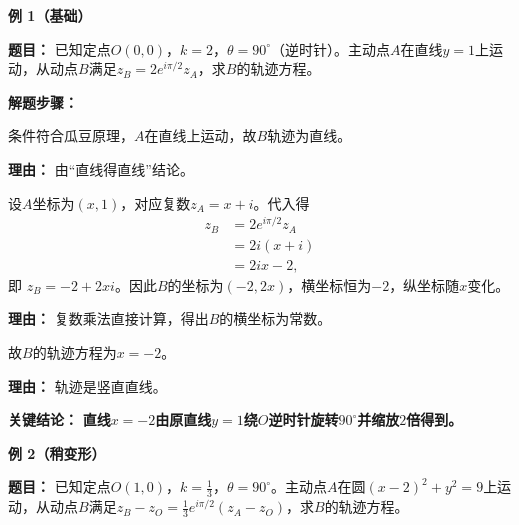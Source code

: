 \begin{examplebox}
	\textbf{\textcolor{CExample}{例 1（基础）}}

	\textbf{\textcolor{CExample}{题目：}}
	已知定点$O(0,0)$，$k=2$，$\theta=90^\circ$（逆时针）。主动点$A$在直线$y=1$上运动，从动点$B$满足$z_B = 2 e^{i\pi/2} z_A$，求$B$的轨迹方程。

	\textbf{\textcolor{CExample}{解题步骤：}}
	\begin{description}[style=nextline, leftmargin=2.8em, labelsep=0.5em, itemsep=0.45em]
		\item[\textbf{第一步（识别模型）：}] 条件符合瓜豆原理，$A$在直线上运动，故$B$轨迹为直线。
			\par\textbf{理由：} 由“直线得直线”结论。
		\item[\textbf{第二步（代数推导）：}] 设$A$坐标为$(x,1)$，对应复数$z_A=x+i$。代入得
			\[
				\begin{aligned}
					z_B &= 2e^{i\pi/2}z_A \\
					&= 2i(x+i) \\
					&= 2ix - 2,
			\end{aligned}
			\]
			即 $z_B = -2 + 2xi$。因此$B$的坐标为$(-2,2x)$，横坐标恒为$-2$，纵坐标随$x$变化。
			\par\textbf{理由：} 复数乘法直接计算，得出$B$的横坐标为常数。
		\item[\textbf{第三步（写出方程）：}] 故$B$的轨迹方程为$x=-2$。
			\par\textbf{理由：} 轨迹是竖直直线。
	\end{description}

	\textbf{\textcolor{CExample}{关键结论：}}
	\textbf{直线$x=-2$由原直线$y=1$绕$O$逆时针旋转$90^\circ$并缩放$2$倍得到。}

	\medskip
	\textbf{\textcolor{CExample}{例 2（稍变形）}}

	\textbf{\textcolor{CExample}{题目：}}
	已知定点$O(1,0)$，$k=\frac13$，$\theta=90^\circ$。主动点$A$在圆$(x-2)^2+y^2=9$上运动，从动点$B$满足$z_B - z_O = \frac13 e^{i\pi/2}(z_A - z_O)$，求$B$的轨迹方程。


\end{examplebox}
